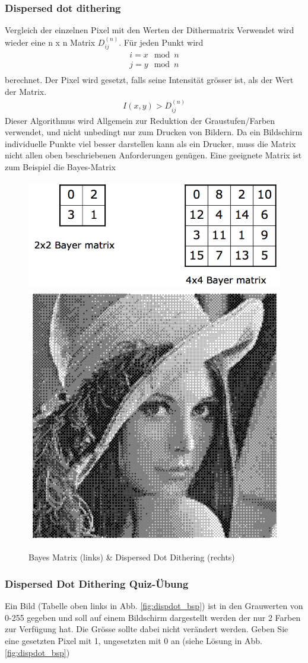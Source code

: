 \subsubsection{Dispersed dot dithering} 
Vergleich der einzelnen Pixel mit den Werten der Dithermatrix
Verwendet wird wieder eine n x n Matrix \(D_{ij}^{(n)}\). Für jeden Punkt wird
\begin{gather*}
i = x \mod n\\
j = y \mod n\\
\end{gather*}                                           
berechnet. Der Pixel wird gesetzt, falls seine Intensität grösser ist, als der Wert der Matrix.
\begin{gather*}
I(x,y) > D_{ij}^{(n)}   
\end{gather*}
Dieser Algorithmus wird Allgemein zur Reduktion der Graustufen/Farben verwendet, und nicht unbedingt nur zum Drucken von Bildern. Da ein Bildschirm individuelle Punkte viel besser darstellen kann als ein Drucker, muss die Matrix nicht allen oben beschriebenen Anforderungen genügen. Eine geeignete Matrix ist zum Beispiel die Bayes-Matrix
\begin{figure}[!ht]
\centering
\includegraphics[width=0.5\linewidth]{fig/bayesmatrix}
\includegraphics[width=0.3\linewidth]{fig/disperseddot}
\caption{Bayes Matrix (links) \& Dispersed Dot Dithering (rechts)}
\label{fig:bayesmatrix}
\end{figure}


\subsubsection{Dispersed Dot Dithering Quiz-Übung}
Ein Bild (Tabelle oben links in Abb. \ref{fig:dispdot_bsp}) ist in den Grauwerten von 0-255 gegeben und soll auf einem Bildschirm dargestellt werden der nur 2 Farben zur Verfügung hat. Die Grösse sollte dabei nicht verändert werden. 
Geben Sie eine gesetzten Pixel mit 1, ungesetzten mit 0 an (siehe Lösung in Abb. \ref{fig:dispdot_bsp})

